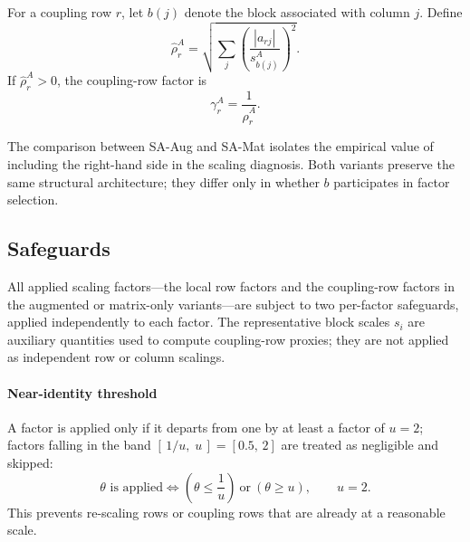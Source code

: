 \documentclass[AMA,Times1COL]{WileyNJDv5} %
\newcommand{\abs}[1]{\left\lvert #1 \right\rvert}
\newcommand{\methodAug}{SA-Aug}
\newcommand{\methodMat}{SA-Mat}
\begin{document}
For a coupling row $r$, let $b(j)$ denote the block associated with column $j$. Define
\begin{equation}
\widehat{\rho}_r^{A}
=
\sqrt{
\sum_j
\left(
\frac{\abs{a_{rj}}}{s_{b(j)}^{A}}
\right)^2
}.
\label{eq:matrix-coupling-rho}
\end{equation}
If $\widehat{\rho}_r^{A}>0$, the coupling-row factor is
\begin{equation}
\gamma_r^{A}=\frac{1}{\widehat{\rho}_r^{A}}.
\label{eq:matrix-coupling-factor}
\end{equation}

The comparison between \methodAug{} and \methodMat{} isolates the empirical value of
including the right-hand side in the scaling diagnosis. Both variants preserve the same
structural architecture; they differ only in whether $b$ participates in factor selection.

\subsection{Safeguards}

All applied scaling factors---the local row factors and the coupling-row factors in the
augmented or matrix-only variants---are subject to two per-factor safeguards, applied
independently to each factor. The representative block scales $s_i$ are auxiliary
quantities used to compute coupling-row proxies; they are not applied as independent
row or column scalings.

\paragraph{Near-identity threshold}
A factor is applied only if it departs from one by at least a factor of $u=2$; factors
falling in the band $[\,1/u,\;u\,]=[0.5,\,2]$ are treated as negligible and skipped:
\begin{equation}
\theta \text{ is applied}
\iff
\left(\theta \le \frac{1}{u}\right)\ \text{or}\ \left(\theta \ge u\right),
\qquad u=2 .
\label{eq:near-identity}
\end{equation}
This prevents re-scaling rows or coupling rows that are already at a reasonable scale.
\end{document}
